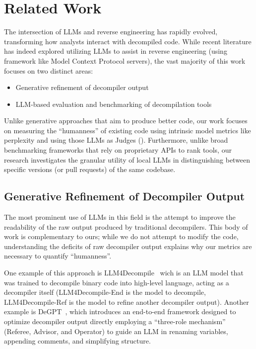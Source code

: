 \chapter{Related Work}\label{ch:related}

The intersection of \acp{LLM} and reverse engineering has rapidly evolved, 
transforming how analysts interact with decompiled code. While recent 
literature has indeed explored utilizing \ac{LLM}s to assist in reverse engineering (using framework like Model Context Protocol servers), 
the vast majority of this work focuses on two distinct areas: 
\begin{itemize}
    \item Generative refinement of decompiler output
    \item \ac{LLM}-based evaluation and benchmarking of decompilation tools
\end{itemize}

Unlike generative approaches that aim to produce better code, our work focuses on 
measuring the ``humanness'' of existing code using intrinsic model metrics like perplexity and using those \acp{LLM} as Judges (). 
Furthermore, unlike broad benchmarking frameworks that rely on proprietary \acp{API} to rank tools, 
our research investigates the granular utility of local \acp{LLM} in distinguishing between specific versions (or pull requests) of the same codebase.

\section{Generative Refinement of Decompiler Output}\label{sec:genref}

The most prominent use of \ac{LLM}s in this field is the attempt to improve the readability of the raw 
output produced by traditional decompilers. This body of work is complementary 
to ours; while we do not attempt to modify the code, understanding the deficits of raw decompiler output 
explains why our metrics are necessary to quantify ``humanness''.

One example of this approach is LLM4Decompile~\cite{Paper:Tan_2024} wich is an \ac{LLM} model
that was trained to decompile binary code into high-level language, acting as a decompiler itself 
(LLM4Decompile-End is the model to decompile, LLM4Decompile-Ref is the model to refine another decompiler output).
Another example is DeGPT~\cite{Paper:Hu2024DeGPTOD}, which introduces an end-to-end 
framework designed to optimize decompiler output directly employing a ``three-role mechanism'' 
(Referee, Advisor, and Operator) to guide an \ac{LLM} in renaming variables, appending comments, 
and simplifying structure. 

